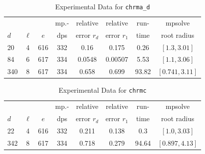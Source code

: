 \documentclass[runningheads]{llncs}
\begin{document}
\begin{table}
\caption{Experimental Data for \texttt{chrma\_d}} %
\label{tab:chrma_d}
\vskip -0.15in
\begin{center}
\begin{small}
\begin{sc}
\begin{tabular}{lccccccc}
\toprule
&  &  & mp.-& relative  & relative & run- & mpsolve \\
$d$& $\ell$& $e$ & dps&error $r_d$       & error $r_1$ &time& root radius\\
\midrule
20 & 4 & 616 & 332 & 0.16 & 0.175 & 0.26 & $[1.3, 3.01]$\\
 84 & 6 & 617 & 334 & 0.0548 & 0.00507 & 5.53 & $[1.1, 3.06]$\\
 340 & 8 & 617 & 334 & 0.658 & 0.699 & 93.82 & $[0.741, 3.11]$\\
\bottomrule
\end{tabular}
\end{sc}
\end{small}
\end{center}
\vskip 0.05in
\end{table}


\begin{table}
\caption{Experimental Data for \texttt{chrmc}} %
\label{tab:chrmc}
\vskip -0.15in
\begin{center}
\begin{small}
\begin{sc}
\begin{tabular}{lccccccc}
\toprule
&  &  & mp.-& relative  & relative & run- & mpsolve \\
$d$& $\ell$& $e$ & dps&error $r_d$       & error $r_1$ &time& root radius\\
\midrule
 22 & 4 & 616 & 332 & 0.211 & 0.138 & 0.3 & $[1.0, 3.03]$\\
 342 & 8 & 617 & 334 & 0.718 & 0.279 & 94.64 & $[0.897, 4.13]$\\
\bottomrule
\end{tabular}
\end{sc}
\end{small}
\end{center}
\vskip 0.05in
\end{table}
\end{document}
